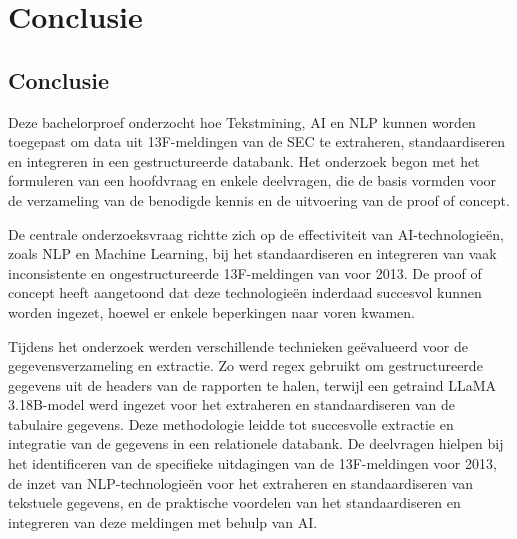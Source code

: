 
\chapter{Conclusie}%
\label{ch:conclusie}






\section{Conclusie}
Deze bachelorproef onderzocht hoe Tekstmining, AI en NLP kunnen worden toegepast om data uit 13F-meldingen van de SEC te extraheren, standaardiseren en integreren in een gestructureerde databank. Het onderzoek begon met het formuleren van een hoofdvraag en enkele deelvragen, die de basis vormden voor de verzameling van de benodigde kennis en de uitvoering van de proof of concept.

De centrale onderzoeksvraag richtte zich op de effectiviteit van AI-technologieën, zoals NLP en Machine Learning, bij het standaardiseren en integreren van vaak inconsistente en ongestructureerde 13F-meldingen van voor 2013. De proof of concept heeft aangetoond dat deze technologieën inderdaad succesvol kunnen worden ingezet, hoewel er enkele beperkingen naar voren kwamen.

Tijdens het onderzoek werden verschillende technieken geëvalueerd voor de gegevensverzameling en extractie. Zo werd regex gebruikt om gestructureerde gegevens uit de headers van de rapporten te halen, terwijl een getraind LLaMA 3.18B-model werd ingezet voor het extraheren en standaardiseren van de tabulaire gegevens. Deze methodologie leidde tot succesvolle extractie en integratie van de gegevens in een relationele databank. De deelvragen hielpen bij het identificeren van de specifieke uitdagingen van de 13F-meldingen voor 2013, de inzet van NLP-technologieën voor het extraheren en standaardiseren van tekstuele gegevens, en de praktische voordelen van het standaardiseren en integreren van deze meldingen met behulp van AI.

